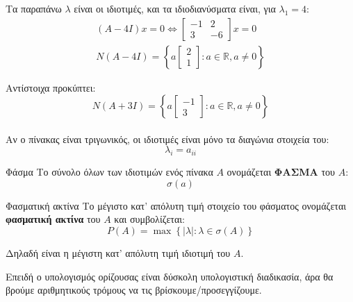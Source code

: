 \documentclass[11pt,a4paper,notitlepage,fleqn]{article}
\begin{document}
    Τα παραπάνω \( \lambda \) είναι οι ιδιοτιμές, και τα ιδιοδιανύσματα
    είναι, για \( \lambda_1 = 4 \):
    \begin{gather*}
    	(A-4I)x = 0 \iff \left[\begin{matrix}
    	-1&2\\3&-6
    	\end{matrix}\right]x = 0 \\ N(A-4I)= \left\lbrace 
    	a\left[\begin{matrix}
    	2\\1
    	\end{matrix}\right]: a \in\mathbb R, a\neq 0
    	 \right\rbrace
    \end{gather*}
    
    Αντίστοιχα προκύπτει:
    \[
    N(A+3I) = \left\lbrace a\left[
    \begin{matrix}
    -1\\3
    \end{matrix}
    \right] : a \in\mathbb R, a\neq 0 \right\rbrace
    \]
    
    \paragraph{}
    Αν ο πίνακας είναι τριγωνικός, οι ιδιοτιμές είναι μόνο τα διαγώνια
    στοιχεία του:
    \[
    \lambda_i = a_{ii}
    \]
    
    \begin{defn}{Φάσμα}{}
    	Το σύνολο όλων των ιδιοτιμών ενός πίνακα \( A \) ονομάζεται
    	\textbf{ΦΑΣΜΑ} του \( A \):
    	\[
    	\sigma(a)
    	\]
    \end{defn}
    
    \begin{defn}{Φασματική ακτίνα}{}
    	Το μέγιστο κατ' απόλυτη τιμή στοιχείο του φάσματος ονομάζεται
    	\textbf{φασματική ακτίνα} του \( A \) και συμβολίζεται:
    	\[
    	P(A) = \max\left\lbrace |\lambda|:\lambda \in \sigma(A)
    	\right\rbrace
    	\]
    	
    	Δηλαδή είναι η μέγιστη κατ' απόλυτη τιμή ιδιοτιμή του \( A \).
    \end{defn}
    
    Επειδή ο υπολογισμός ορίζουσας είναι δύσκολη υπολογιστική διαδικασία,
    άρα θα βρούμε αριθμητικούς τρόμους να τις βρίσκουμε/προσεγγίζουμε.
    
\end{document}
